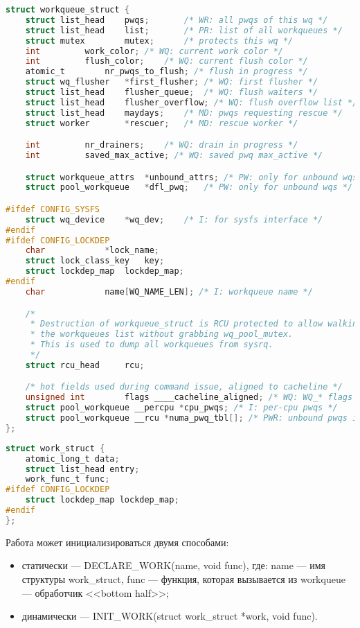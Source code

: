 \begin{lstlisting}[language=c, label=some-code, caption=Структура workqueue\_struct]
struct workqueue_struct {
	struct list_head	pwqs;		/* WR: all pwqs of this wq */
	struct list_head	list;		/* PR: list of all workqueues */
	struct mutex		mutex;		/* protects this wq */
	int			work_color;	/* WQ: current work color */
	int			flush_color;	/* WQ: current flush color */
	atomic_t		nr_pwqs_to_flush; /* flush in progress */
	struct wq_flusher	*first_flusher;	/* WQ: first flusher */
	struct list_head	flusher_queue;	/* WQ: flush waiters */
	struct list_head	flusher_overflow; /* WQ: flush overflow list */
	struct list_head	maydays;	/* MD: pwqs requesting rescue */
	struct worker		*rescuer;	/* MD: rescue worker */

	int			nr_drainers;	/* WQ: drain in progress */
	int			saved_max_active; /* WQ: saved pwq max_active */

	struct workqueue_attrs	*unbound_attrs;	/* PW: only for unbound wqs */
	struct pool_workqueue	*dfl_pwq;	/* PW: only for unbound wqs */

#ifdef CONFIG_SYSFS
	struct wq_device	*wq_dev;	/* I: for sysfs interface */
#endif
#ifdef CONFIG_LOCKDEP
	char			*lock_name;
	struct lock_class_key	key;
	struct lockdep_map	lockdep_map;
#endif
	char			name[WQ_NAME_LEN]; /* I: workqueue name */

	/*
	 * Destruction of workqueue_struct is RCU protected to allow walking
	 * the workqueues list without grabbing wq_pool_mutex.
	 * This is used to dump all workqueues from sysrq.
	 */
	struct rcu_head		rcu;

	/* hot fields used during command issue, aligned to cacheline */
	unsigned int		flags ____cacheline_aligned; /* WQ: WQ_* flags */
	struct pool_workqueue __percpu *cpu_pwqs; /* I: per-cpu pwqs */
	struct pool_workqueue __rcu *numa_pwq_tbl[]; /* PWR: unbound pwqs indexed by node */
};

\end{lstlisting}

\begin{lstlisting}[language=c, label=some-code, caption=Структура work\_struct]
struct work_struct {
	atomic_long_t data;
	struct list_head entry;
	work_func_t func;
#ifdef CONFIG_LOCKDEP
	struct lockdep_map lockdep_map;
#endif
};
\end{lstlisting}

Работа может инициализироваться двумя способами:

\begin{itemize}
    \item статически --- DECLARE\_WORK(name, void func), где: name --- имя структуры work\_struct, func --- функция, которая вызывается из workqueue --- обработчик <<bottom half>>;
    \item динамически --- INIT\_WORK(struct work\_struct *work, void func).
\end{itemize}

